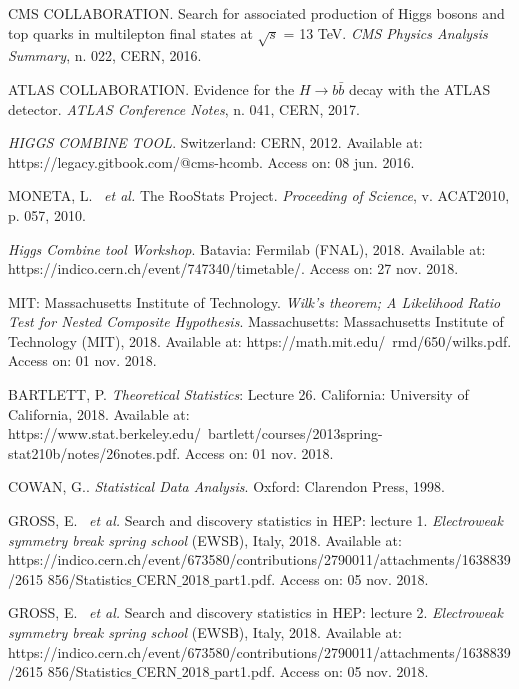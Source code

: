 \begin{thebibliography}{}
CMS COLLABORATION. Search for associated production of Higgs bosons and top quarks in multilepton final states at $\sqrt{s}$ = 13 TeV. \textit{CMS Physics Analysis Summary}, n. 022, CERN, 2016.

ATLAS COLLABORATION. Evidence for the $H \rightarrow b\bar{b}$ decay with the ATLAS detector. \textit{ATLAS Conference Notes}, n. 041, CERN, 2017.

\textit{HIGGS COMBINE TOOL}. Switzerland: CERN, 2012. Available at: https://legacy.gitbook.com/@cms-hcomb. Access on: 08 jun. 2016.

MONETA, L. ~\textit{et al.} The RooStats Project. \textit{Proceeding of Science}, v. ACAT2010, p. 057, 2010.

\textit{Higgs Combine tool Workshop}. Batavia: Fermilab (FNAL), 2018. Available at: https://indico.cern.ch/event/747340/timetable/. Access on: 27 nov. 2018.

MIT: Massachusetts Institute of Technology. \textit{Wilk’s theorem; A Likelihood Ratio Test for Nested Composite Hypothesis}. Massachusetts: Massachusetts Institute of Technology (MIT), 2018. Available at: https://math.mit.edu/~rmd/650/wilks.pdf. Access on: 01 nov. 2018.

BARTLETT, P. \textit{Theoretical Statistics}: Lecture 26. California: University of California, 2018. Available at: https://www.stat.berkeley.edu/~bartlett/courses/2013spring-stat210b/notes/26notes.pdf. Access on: 01 nov. 2018.

COWAN, G.. \textit{Statistical Data Analysis}. Oxford: Clarendon Press, 1998.

GROSS, E. ~\textit{et al.} Search and discovery statistics in HEP: lecture 1. \textit{Electroweak symmetry break spring school} (EWSB), Italy, 2018. Available at: https://indico.cern.ch/event/673580/contributions/2790011/attachments/1638839/2615 856/Statistics$\_$CERN$\_$2018$\_$part1.pdf. Access on: 05 nov. 2018.

GROSS, E. ~\textit{et al.} Search and discovery statistics in HEP: lecture 2. \textit{Electroweak symmetry break spring school} (EWSB), Italy, 2018. Available at: https://indico.cern.ch/event/673580/contributions/2790011/attachments/1638839/2615 856/Statistics$\_$CERN$\_$2018$\_$part1.pdf. Access on: 05 nov. 2018.



\end{thebibliography}
